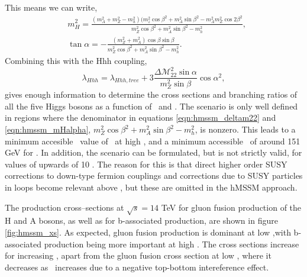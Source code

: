 This means we can write,
\begin{equation}
\label{eqn:hmssm_mHalpha}
\begin{split}
&m^2_H = \frac{(m_A^2+m_Z^2-m_h^2)(m_z^2\cos{\beta}^2+m_A^2\sin{\beta}^2 - m_A^2m_Z^2\cos{2\beta}^2}{m_Z^2\cos{\beta}^2+m_A^2\sin{\beta}^2-m_h^2},\\
&\tan{\alpha} = -\frac{(m_Z^2+m_A^2)\cos{\beta}\sin{\beta}}{m_Z^2\cos{\beta}^2+m_A^2\sin{\beta}^2-m_h^2}.
\end{split}
\end{equation}
Combining this with the Hhh coupling,
\begin{equation}
\label{eqn:hmssm_Hhh}
\lambda_{Hhh} = \lambda_{Hhh,tree} + 3\frac{\Delta\mathcal{M}^2_{22}\sin{\alpha}}{m_Z^2\sin{\beta}}\cos{\alpha}^2,
\end{equation}
gives enough information to determine the cross sections and branching
ratios of all the five Higgs bosons as a function of \mA~and \tanb. The scenario
is only well defined in regions where the denominator in equations
\ref{eqn:hmssm_deltam22} and \ref{eqn:hmssm_mHalpha}, $m_Z^2\cos{\beta}^2+m_A^2\sin{\beta}^2 - m_h^2$, is nonzero. 
This leads to a minimum accesible \mA~value of \mh~at high \tanb, and
a minimum accessible \mA~of around 151 GeV for . In addition, the scenario
can be formulated, but is not strictly valid, for values of \tanb upwards of 10 \cite{CMS-PAS-HIG-16-007}.
The reason for this is that direct higher order SUSY corrections to down-type
fermion couplings and corrections due to SUSY particles in loops become relevant
above , but these are omitted in the hMSSM approach.


The production cross--sections at $\sqrt{s}=14$ TeV for gluon fusion production of the
H and A bosons, as well as for b-associated production, are shown in figure \ref{fig:hmssm_xs}.
As expected, gluon fusion production is dominant at low \tanb,with b-associated
production being more important at high \tanb. The cross sections increase for increasing \tanb,
apart from the gluon fusion cross section at low \tanb, where it decreases as \tanb~increases
due to a negative top-bottom intereference effect.

